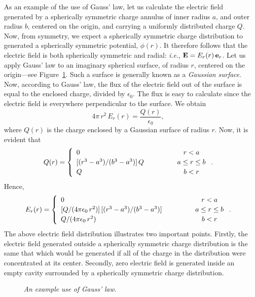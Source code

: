 As an example of the use of Gauss' law, let us calculate the electric field
generated by a spherically symmetric charge annulus of inner radius $a$,
and outer radius $b$, centered on the origin, and carrying a uniformly
distributed charge $Q$. Now, from symmetry, we expect a spherically
symmetric charge distribution to generated a spherically symmetric
potential, $\phi(r)$. It therefore follows that the electric field is both
spherically symmetric and radial: {\em i.e.}, ${\bf E} = E_r(r)\,{\bf e}_r$.
Let us apply Gauss' law to an imaginary spherical surface, of radius
$r$, centered on the origin---see Figure~\ref{fgauss}. Such a surface is generally known as a {\em Gaussian surface}. Now, according to
Gauss' law, the flux of the electric field out of the surface is equal to
the enclosed charge, divided by $\epsilon_0$. The flux is easy to calculate since the electric field is everywhere perpendicular to the
surface. We obtain
$$
4\pi\,r^2\,E_r(r) = \frac{Q(r)}{\epsilon_0},
$$
where $Q(r)$ is the charge enclosed by a Gaussian surface of radius $r$.
Now, it is evident that
\begin{equation}
Q(r) = \left\{ 
\begin{array}{lcc}
0&\mbox{\hspace{1cm}}&r<a\\[0.5ex]
[(r^3-a^3)/(b^3-a^3)]\, Q&&a\leq r\leq b\\[0.5ex]
Q&&b<r
\end{array}
\right..
\end{equation}
Hence,
\begin{equation}
E_r(r) = \left\{ 
\begin{array}{lcc}
0&\mbox{\hspace{1cm}}&r<a\\[0.5ex]
[Q/(4\pi\epsilon_0\,r^2)]\,[(r^3-a^3)/(b^3-a^3)]&&a\leq r\leq b\\[0.5ex]
Q/(4\pi\epsilon_0\,r^2)&&b<r
\end{array}
\right..
\end{equation}
The above electric field distribution illustrates two important points. Firstly,
 the electric field generated outside a spherically symmetric
charge distribution is the same that which would be generated if all of the charge in the distribution
were concentrated at its center. Secondly, zero electric field is generated inside
an empty cavity surrounded by a spherically symmetric charge distribution.
\begin{figure}
\centerline{}
\caption{\em An example use of Gauss' law.}\label{fgauss}
\end{figure}

